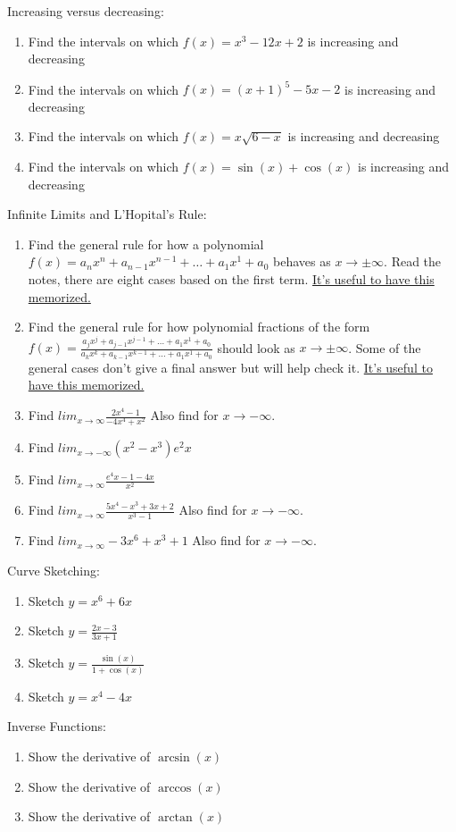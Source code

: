 \documentclass[12pt]{amsart}
\begin{document}
Increasing versus decreasing:
\begin{enumerate}[resume]
\item Find the intervals on which $f(x) = x^3 -12x + 2$ is increasing and decreasing
\item Find the intervals on which $f(x) = (x + 1)^5 - 5x -2$ is increasing and decreasing
\item Find the intervals on which $f(x) = x\sqrt{6 - x}$ is increasing and decreasing
\item Find the intervals on which $f(x) = \sin(x) + \cos(x)$ is increasing and decreasing
\end{enumerate}
Infinite Limits and L'Hopital's Rule:
\begin{enumerate}[resume]
\item Find the general rule for how a polynomial $f(x) = a_{n}x^n + a_{n-1}x^{n-1} + \dots + a_{1}x^1 + a_0$ behaves as $x \to \pm\infty$. Read the notes, there are eight cases based on the first term. \underline{It's useful to have this memorized.}
\item Find the general rule for how polynomial fractions of the form $f(x) = \frac{a_{j}x^j + a_{j-1}x^{j-1} + \dots + a_{1}x^1 + a_0}{a_{k}x^k + a_{k-1}x^{k-1} + \dots + a_{1}x^1 + a_0}$ should look as $x \to \pm\infty$. Some of the general cases don't give a final answer but will help check it. \underline{It's useful to have this memorized.}
\item Find $lim_{x \to \infty}\frac{2x^4 - 1}{-4x^4 + x^2}$ Also find for $x \to -\infty$.
\item Find $lim_{x \to -\infty}(x^2 - x^3)e^2x$
\item Find $lim_{x \to \infty}\frac{e^4x - 1 - 4x}{x^2}$
\item Find $lim_{x \to \infty}\frac{5x^4 - x^3 + 3x + 2}{x^3 - 1}$ Also find for $x \to -\infty$.
\item Find $lim_{x \to \infty}-3x^6 + x^3 + 1$ Also find for $x \to -\infty$.
\end{enumerate}
Curve Sketching:
\begin{enumerate}[resume]
\item Sketch $y = x^6 + 6x$
\item Sketch $y = \frac{2x - 3}{3x + 1}$
\item Sketch $y = \frac{\sin(x)}{1 + \cos(x)}$
\item Sketch $y = x^4 - 4x$ \\
\end{enumerate}
Inverse Functions:
\begin{enumerate}[resume]
\item Show the derivative of $\arcsin(x)$
\item Show the derivative of $\arccos(x)$
\item Show the derivative of $\arctan(x)$
\end{enumerate}
\end{document}
